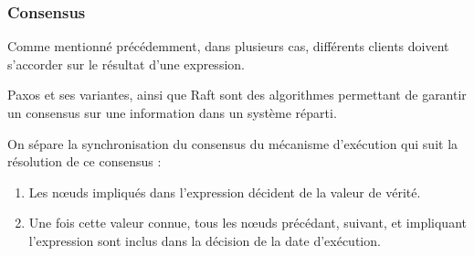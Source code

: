 \documentclass{article}
\newcommand\trigger{point d'interaction\xspace}
\begin{document}
\subsubsection{Consensus}\label{section.consensus}
Comme mentionné précédemment, dans plusieurs cas, différents clients doivent s'accorder sur le résultat d'une expression.

Paxos et ses variantes\cite{lamport1998part}, ainsi que Raft\cite{ongaro2014search} sont des algorithmes permettant de garantir un consensus sur une information dans un système réparti. 

On sépare la synchronisation du consensus du mécanisme d'exécution qui suit la résolution de ce consensus : 
\begin{enumerate}
    \item Les nœuds impliqués dans l'expression décident de la valeur de vérité.
    \item Une fois cette valeur connue, tous les nœuds précédant, suivant, et impliquant l'expression sont inclus dans la décision de la date d'exécution.
\end{enumerate}







\end{document}
